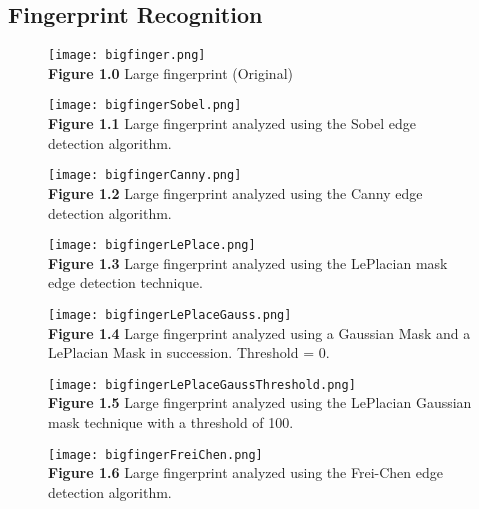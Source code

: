 \documentclass{article}%
\begin{document}
\subsection{Fingerprint Recognition}

\begin{figure}[h]
\centering
\texttt{[image: bigfinger.png]}\\
{\bf Figure 1.0} Large fingerprint (Original)
\end{figure}  

\newpage
\begin{figure}[h]
\centering
\texttt{[image: bigfingerSobel.png]}\\
{\bf Figure 1.1} Large fingerprint analyzed using the Sobel edge detection algorithm.   
\end{figure}


\newpage
\begin{figure}[h]
\centering
\texttt{[image: bigfingerCanny.png]}\\
{\bf Figure 1.2} Large fingerprint analyzed using the Canny edge detection algorithm.   
\end{figure}  

\newpage
\begin{figure}[h]
\centering
\texttt{[image: bigfingerLePlace.png]}\\
{\bf Figure 1.3} Large fingerprint analyzed using the LePlacian mask edge detection technique.  
\end{figure}  

\newpage
\begin{figure}[h]
\centering
\texttt{[image: bigfingerLePlaceGauss.png]}\\
{\bf Figure 1.4} Large fingerprint analyzed using a Gaussian Mask and a LePlacian Mask in succession. Threshold = 0.   
\end{figure}  

\newpage
\begin{figure}[h]
\centering
\texttt{[image: bigfingerLePlaceGaussThreshold.png]}\\
{\bf Figure 1.5} Large fingerprint analyzed using the LePlacian Gaussian mask technique with a threshold of 100.  
\end{figure}  

\newpage
\begin{figure}[h]
\centering
\texttt{[image: bigfingerFreiChen.png]}\\
{\bf Figure 1.6} Large fingerprint analyzed using the Frei-Chen edge detection algorithm.  
 \end{figure}  
\end{document}

